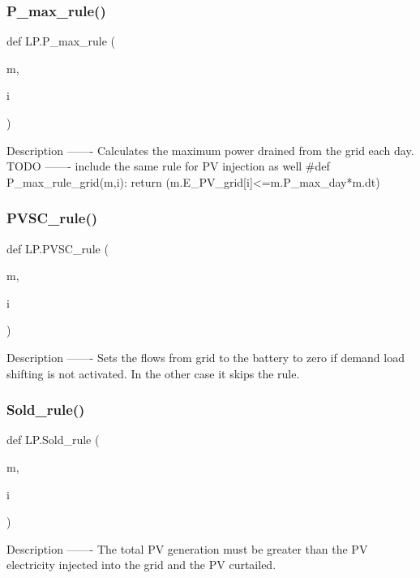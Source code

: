\subsubsection{\texorpdfstring{P\+\_\+max\+\_\+rule()}{P\_max\_rule()}}
{\footnotesize\ttfamily def L\+P.\+P\+\_\+max\+\_\+rule (\begin{DoxyParamCaption}\item[{}]{m,  }\item[{}]{i }\end{DoxyParamCaption})}

\begin{DoxyVerb}Description
-------
Calculates the maximum power drained from the grid each day.
TODO
-------
include the same rule for PV injection as well
#def P_max_rule_grid(m,i):
return (m.E_PV_grid[i]<=m.P_max_day*m.dt)
\end{DoxyVerb}
 \mbox{\label{namespace_l_p_acf9197fcddcdd5c3bd324a1227235ee2}} 
\subsubsection{\texorpdfstring{P\+V\+S\+C\+\_\+rule()}{PVSC\_rule()}}
{\footnotesize\ttfamily def L\+P.\+P\+V\+S\+C\+\_\+rule (\begin{DoxyParamCaption}\item[{}]{m,  }\item[{}]{i }\end{DoxyParamCaption})}

\begin{DoxyVerb}Description
-------
Sets the flows from grid to the battery to zero if demand load shifting is not activated. In the other case it skips the rule.
\end{DoxyVerb}
 \mbox{\label{namespace_l_p_a1b5e92f8502a9cbcd92198d9857a6d83}} 
\subsubsection{\texorpdfstring{Sold\+\_\+rule()}{Sold\_rule()}}
{\footnotesize\ttfamily def L\+P.\+Sold\+\_\+rule (\begin{DoxyParamCaption}\item[{}]{m,  }\item[{}]{i }\end{DoxyParamCaption})}

\begin{DoxyVerb}Description
-------
The total PV generation must be greater than the PV electricity injected into the grid and the PV curtailed.
\end{DoxyVerb}
 